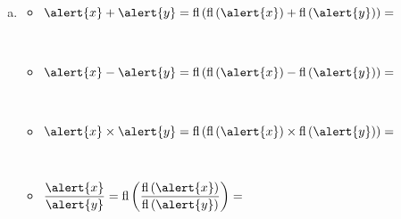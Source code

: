 \begin{frame}
	\begin{solution}
		\begin{enumerate}[c)]

			\item

			      \begin{multicols}{2}
				      \begin{itemize}
					      \item

					            \begin{math}
						            \alert{x}+\alert{y}=
						            \operatorname{fl}
						            \left(
						            \operatorname{fl}\left(\alert{x}\right)+
						            \operatorname{fl}\left(\alert{y}\right)
						            \right)=
					            \end{math}

					            \

					      \item

					            \begin{math}
						            \alert{x}-\alert{y}=
						            \operatorname{fl}
						            \left(
						            \operatorname{fl}\left(\alert{x}\right)-
						            \operatorname{fl}\left(\alert{y}\right)
						            \right)=
					            \end{math}

					            \

					      \item

					            \begin{math}
						            \alert{x}\times\alert{y}=
						            \operatorname{fl}
						            \left(
						            \operatorname{fl}\left(\alert{x}\right)\times
						            \operatorname{fl}\left(\alert{y}\right)
						            \right)=
					            \end{math}

					            \

					      \item

					            \begin{math}
						            \dfrac{\alert{x}}{\alert{y}}=
						            \operatorname{fl}
						            \left(
						            \dfrac{
							            \operatorname{fl}\left(\alert{x}\right)
						            }{
							            \operatorname{fl}\left(\alert{y}\right)
						            }
						            \right)=
					            \end{math}
				      \end{itemize}
			      \end{multicols}
		\end{enumerate}


\end{solution}
\end{frame}
